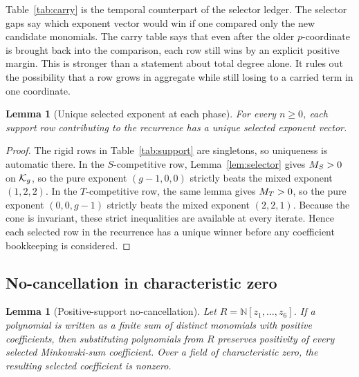 \documentclass[11pt]{article}
\newtheorem{lemma}[theorem]{Lemma}
\theoremstyle{remark}
\numberwithin{equation}{section}
\begin{document}
Table~\ref{tab:carry} is the temporal counterpart of the selector ledger.  The
selector gaps say which exponent vector would win if one compared only the new
candidate monomials.  The carry table says that even after the older
\(p\)-coordinate is brought back into the comparison, each row still wins by an
explicit positive margin.  This is stronger than a statement about total degree
alone.  It rules out the possibility that a row grows in aggregate while still
losing to a carried term in one coordinate.

\begin{lemma}[Unique selected exponent at each phase]\label{lem:unique-selection}
For every \(n\geq 0\), each support row contributing to the recurrence has a
unique selected exponent vector.
\end{lemma}

\begin{proof}
The rigid rows in Table~\ref{tab:support} are singletons, so uniqueness is
automatic there.  In the \(S\)-competitive row, Lemma~\ref{lem:selector} gives
\(M_S>0\) on \(\mathcal{K}_g\), so the pure exponent \((g-1,0,0)\) strictly beats the
mixed exponent \((1,2,2)\).  In the \(T\)-competitive row, the same lemma gives
\(M_T>0\), so the pure exponent \((0,0,g-1)\) strictly beats the mixed exponent
\((2,2,1)\).  Because the cone is invariant, these strict inequalities are
available at every iterate.  Hence each selected row in the recurrence has a
unique winner before any coefficient bookkeeping is considered.
\end{proof}

\subsection{No-cancellation in characteristic zero}\label{sec:nocancel}

\begin{lemma}[Positive-support no-cancellation]\label{lem:nocancel}
Let \(R=\mathbb N[z_1,\dots,z_6]\).  If a polynomial is written as a finite sum
of distinct monomials with positive coefficients, then substituting polynomials
from \(R\) preserves positivity of every selected Minkowski-sum coefficient.
Over a field of characteristic zero, the resulting selected coefficient is
nonzero.
\end{lemma}
\end{document}
